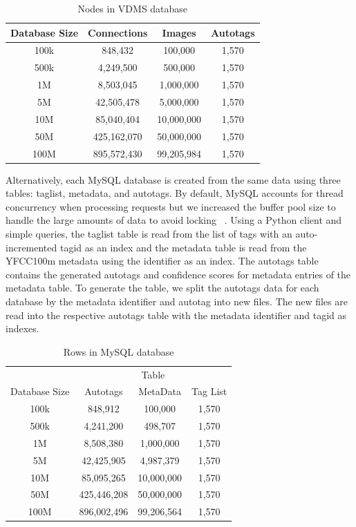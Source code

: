 \begin{table}[h]
\caption{Nodes in VDMS database}
\centering
\begin{tabular}{c c c c}
\hline\hline
Database Size & Connections & Images & Autotags\\
\hline
100k & 848,432      & 100,000     & 1,570\\
500k & 4,249,500    & 500,000     & 1,570\\
1M   & 8,503,045    & 1,000,000   & 1,570\\
5M   & 42,505,478   & 5,000,000   & 1,570\\
10M  & 85,040,404   & 10,000,000  & 1,570\\
50M  & 425,162,070  & 50,000,000  & 1,570\\
100M & 895,572,430  & 99,205,984  & 1,570\\
\hline
\end{tabular}
\label{table:vdmsnodes}
\end{table}

Alternatively, each MySQL database is created from the same data using three
tables: taglist, metadata, and autotags.
By default, MySQL accounts for thread concurrency when processing requests
but we increased the buffer pool size to handle the large amounts
of data to avoid locking ~\cite{mysql}.
Using a Python client and simple queries, the taglist table is
read from the list of tags with an auto-incremented tagid as an
index and the metadata table is read from the YFCC100m metadata
using the identifier as an index.
The autotags table contains the generated autotags and confidence
scores for metadata entries of the metadata table.
To generate the table, we split the autotags data for each database
by the metadata identifier and autotag into new files.
The new files are read into the respective autotags table
with the metadata identifier and tagid as indexes.

\begin{table}[h]
\caption{Rows in MySQL database}
\centering
\begin{tabular}{c c c c}
\hline\hline
 & \multicolumn{3}{c}{Table}\\
\cline{2-4}
Database Size & Autotags & MetaData & Tag List\\
\hline
100k & 848,912     & 100,000    & 1,570\\
500k & 4,241,200   & 498,707    & 1,570\\
1M   & 8,508,380   & 1,000,000  & 1,570\\
5M   & 42,425,905  & 4,987,379  & 1,570\\
10M  & 85,095,265  & 10,000,000 & 1,570\\
50M  & 425,446,208 & 50,000,000 & 1,570\\
100M & 896,002,496 & 99,206,564 & 1,570\\
\hline
\end{tabular}
\label{table:mysqltables}
\end{table}

